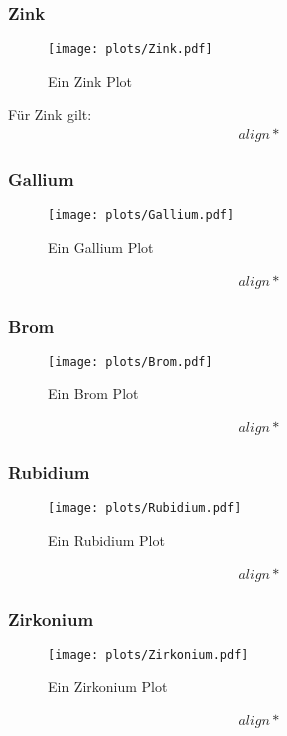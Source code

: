 \subsubsection{Zink}
\begin{figure}
    \centering
    \texttt{[image: plots/Zink.pdf]}
    \caption{Ein Zink Plot}
    \label{fig:Zink}
\end{figure}
Für Zink gilt:
\begin{align*}
    align*
\end{align*}

\subsubsection{Gallium}
\begin{figure}
    \centering
    \texttt{[image: plots/Gallium.pdf]}
    \caption{Ein Gallium Plot}
    \label{fig:Gallium}
\end{figure}
\begin{align*}
    align*
\end{align*}

\subsubsection{Brom}
\begin{figure}
    \centering
    \texttt{[image: plots/Brom.pdf]}
    \caption{Ein Brom Plot}
    \label{fig:Brom}
\end{figure}
\begin{align*}
    align*
\end{align*}

\subsubsection{Rubidium}
\begin{figure}
    \centering
    \texttt{[image: plots/Rubidium.pdf]}
    \caption{Ein Rubidium Plot}
    \label{fig:Rubidium}
\end{figure}
\begin{align*}
    align*
\end{align*}

\subsubsection{Zirkonium}
\begin{figure}
    \centering
    \texttt{[image: plots/Zirkonium.pdf]}
    \caption{Ein Zirkonium Plot}
    \label{fig:Zirkonium}
\end{figure}
\begin{align*}
    align*
\end{align*}

